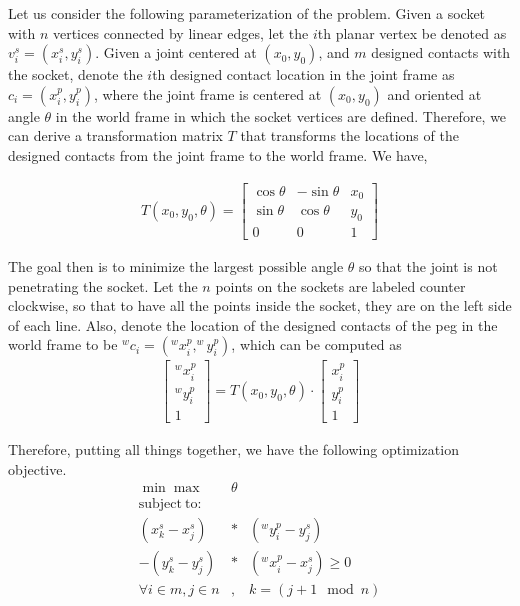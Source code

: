 Let us consider the following parameterization of the problem. Given a socket with $n$ vertices connected by linear edges, let the $i$th planar vertex be denoted as $v^s_i = (x^s_i, y^s_i)$. Given a joint centered at $(x_0, y_0)$, and $m$ designed contacts with the socket, denote the $i$th designed contact location in the joint frame as $c_i = (x^p_i, y^p_i)$, where the joint frame is centered at $(x_0, y_0)$ and oriented at angle $\theta$ in the world frame in which the socket vertices are defined. Therefore, we can derive a transformation matrix $T$ that transforms the locations of the designed contacts from the joint frame to the world frame. We have, 

\begin{eqnarray}
T(x_0, y_0, \theta) = \begin{bmatrix}
\cos\theta & -\sin\theta & x_0\\
\sin\theta & \cos\theta & y_0 \\
0 & 0 & 1
\end{bmatrix}
\end{eqnarray}


The goal then is to minimize the largest possible angle $\theta$ so that the joint is not penetrating the socket. Let the $n$ points on the sockets are labeled counter clockwise, so that to have all the points inside the socket, they are on the left side of each line. Also, denote the location of the designed contacts of the peg in the world frame to be $^wc_i = (^wx^p_i, ^wy^p_i)$, which can be computed as
\begin{eqnarray}
\begin{bmatrix}
^wx^p_i\\ ^wy^p_i\\ 1
\end{bmatrix} = T(x_0, y_0, \theta) \cdot\begin{bmatrix}
x^p_i\\ y^p_i\\ 1
\end{bmatrix}
\end{eqnarray}

Therefore, putting all things together, we have the following optimization objective. 
\begin{eqnarray}
\min\max&\theta\\
\mathrm{subject\ to: } & \nonumber\\
(x^s_{k}-x^s_{j})&*&(^wy^p_i-y^s_{j})\nonumber\\
 - (y^s_{k}-y^s_{j})&*&(^wx^p_i-x^s_{j}) \geq 0 \\
\forall i\in m, j\in n&,& k=(j+1\mod n)\nonumber
\end{eqnarray}

